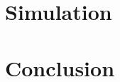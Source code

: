 \documentclass{article}
\begin{document}

\section*{Simulation}



\section*{Conclusion}




%

%

\end{document}
